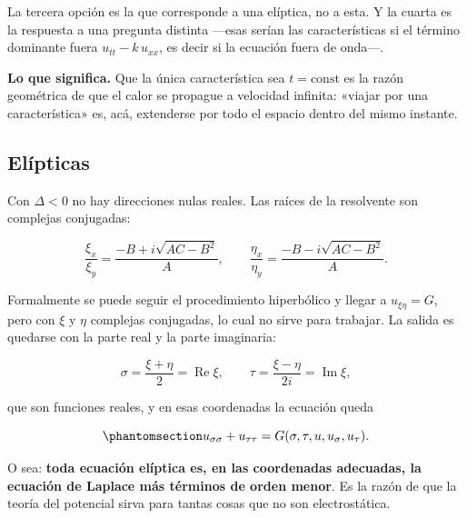 \documentclass[
  spanish,
  a4paper,
]{scrbook}
\theoremstyle{definition}
\theoremstyle{plain}
\theoremstyle{definition}
\theoremstyle{plain}
\theoremstyle{definition}
\theoremstyle{remark}
\begin{document}
La tercera opción es la que corresponde a una elíptica, no a esta. Y la
cuarta es la respuesta a una pregunta distinta ---esas serían las
características si el término dominante fuera \(u_{tt} - k\,u_{xx}\), es
decir si la ecuación fuera de onda---.

\textbf{Lo que significa.} Que la única característica sea
\(t=\text{const}\) es la razón geométrica de que el calor se propague a
velocidad infinita: «viajar por una característica» es, acá, extenderse
por todo el espacio dentro del mismo instante.

\subsection{Elípticas}\label{sec-canonica-eliptica}

Con \(\Delta < 0\) no hay direcciones nulas reales. Las raíces de la
resolvente son complejas conjugadas:

\[
\frac{\xi_x}{\xi_y} = \frac{-B + i\sqrt{AC-B^2}}{A}, \qquad
\frac{\eta_x}{\eta_y} = \frac{-B - i\sqrt{AC-B^2}}{A} .
\]

Formalmente se puede seguir el procedimiento hiperbólico y llegar a
\(u_{\xi\eta} = G\), pero con \(\xi\) y \(\eta\) complejas conjugadas,
lo cual no sirve para trabajar. La salida es quedarse con la parte real
y la parte imaginaria:

\[
\sigma = \frac{\xi+\eta}{2} = \operatorname{Re}\xi, \qquad
\tau = \frac{\xi-\eta}{2i} = \operatorname{Im}\xi ,
\]

que son funciones reales, y en esas coordenadas la ecuación queda

\begin{equation}\protect\phantomsection\label{eq-canonica-eliptica}{
u_{\sigma\sigma} + u_{\tau\tau} = G(\sigma,\tau,u,u_\sigma,u_\tau).
}\end{equation}

O sea: \textbf{toda ecuación elíptica es, en las coordenadas adecuadas,
la ecuación de Laplace más términos de orden menor}. Es la razón de que
la teoría del potencial sirva para tantas cosas que no son
electrostática.
\end{document}
